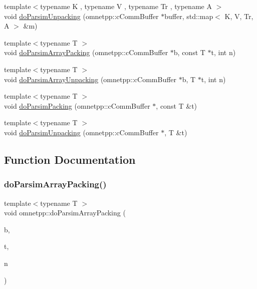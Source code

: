 \begin{DoxyCompactItemize}
\item 
{\footnotesize template$<$typename K , typename V , typename Tr , typename A $>$ }\\void \hyperlink{namespaceomnetpp_a6fd2557203871e46db43fa9c63968117}{do\+Parsim\+Unpacking} (omnetpp\+::c\+Comm\+Buffer $\ast$buffer, std\+::map$<$ K, V, Tr, A $>$ \&m)
\item 
{\footnotesize template$<$typename T $>$ }\\void \hyperlink{namespaceomnetpp_a55066a1505082b338d233957ee65f0ac}{do\+Parsim\+Array\+Packing} (omnetpp\+::c\+Comm\+Buffer $\ast$b, const T $\ast$t, int n)
\item 
{\footnotesize template$<$typename T $>$ }\\void \hyperlink{namespaceomnetpp_aace4e02d3cd181249cf81a4bf8827fa7}{do\+Parsim\+Array\+Unpacking} (omnetpp\+::c\+Comm\+Buffer $\ast$b, T $\ast$t, int n)
\item 
{\footnotesize template$<$typename T $>$ }\\void \hyperlink{namespaceomnetpp_a41f5f036ca92034bc3b29ad1f9f96903}{do\+Parsim\+Packing} (omnetpp\+::c\+Comm\+Buffer $\ast$, const T \&t)
\item 
{\footnotesize template$<$typename T $>$ }\\void \hyperlink{namespaceomnetpp_a7336b297a32484942d52667dae7c7248}{do\+Parsim\+Unpacking} (omnetpp\+::c\+Comm\+Buffer $\ast$, T \&t)
\end{DoxyCompactItemize}


\subsection{Function Documentation}
\mbox{\label{namespaceomnetpp_a55066a1505082b338d233957ee65f0ac}} 
\subsubsection{\texorpdfstring{do\+Parsim\+Array\+Packing()}{doParsimArrayPacking()}}
{\footnotesize\ttfamily template$<$typename T $>$ \\
void omnetpp\+::do\+Parsim\+Array\+Packing (\begin{DoxyParamCaption}\item[{omnetpp\+::c\+Comm\+Buffer $\ast$}]{b,  }\item[{const T $\ast$}]{t,  }\item[{int}]{n }\end{DoxyParamCaption})}

